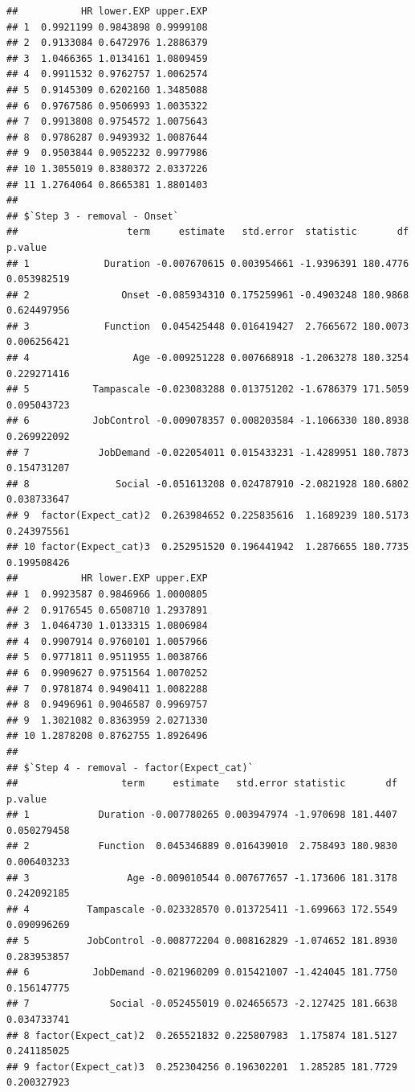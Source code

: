 \documentclass[
]{book}
\begin{document}
\begin{verbatim}
##           HR lower.EXP upper.EXP
## 1  0.9921199 0.9843898 0.9999108
## 2  0.9133084 0.6472976 1.2886379
## 3  1.0466365 1.0134161 1.0809459
## 4  0.9911532 0.9762757 1.0062574
## 5  0.9145309 0.6202160 1.3485088
## 6  0.9767586 0.9506993 1.0035322
## 7  0.9913808 0.9754572 1.0075643
## 8  0.9786287 0.9493932 1.0087644
## 9  0.9503844 0.9052232 0.9977986
## 10 1.3055019 0.8380372 2.0337226
## 11 1.2764064 0.8665381 1.8801403
## 
## $`Step 3 - removal - Onset`
##                   term     estimate   std.error  statistic       df     p.value
## 1             Duration -0.007670615 0.003954661 -1.9396391 180.4776 0.053982519
## 2                Onset -0.085934310 0.175259961 -0.4903248 180.9868 0.624497956
## 3             Function  0.045425448 0.016419427  2.7665672 180.0073 0.006256421
## 4                  Age -0.009251228 0.007668918 -1.2063278 180.3254 0.229271416
## 5           Tampascale -0.023083288 0.013751202 -1.6786379 171.5059 0.095043723
## 6           JobControl -0.009078357 0.008203584 -1.1066330 180.8938 0.269922092
## 7            JobDemand -0.022054011 0.015433231 -1.4289951 180.7873 0.154731207
## 8               Social -0.051613208 0.024787910 -2.0821928 180.6802 0.038733647
## 9  factor(Expect_cat)2  0.263984652 0.225835616  1.1689239 180.5173 0.243975561
## 10 factor(Expect_cat)3  0.252951520 0.196441942  1.2876655 180.7735 0.199508426
##           HR lower.EXP upper.EXP
## 1  0.9923587 0.9846966 1.0000805
## 2  0.9176545 0.6508710 1.2937891
## 3  1.0464730 1.0133315 1.0806984
## 4  0.9907914 0.9760101 1.0057966
## 5  0.9771811 0.9511955 1.0038766
## 6  0.9909627 0.9751564 1.0070252
## 7  0.9781874 0.9490411 1.0082288
## 8  0.9496961 0.9046587 0.9969757
## 9  1.3021082 0.8363959 2.0271330
## 10 1.2878208 0.8762755 1.8926496
## 
## $`Step 4 - removal - factor(Expect_cat)`
##                  term     estimate   std.error statistic       df     p.value
## 1            Duration -0.007780265 0.003947974 -1.970698 181.4407 0.050279458
## 2            Function  0.045346889 0.016439010  2.758493 180.9830 0.006403233
## 3                 Age -0.009010544 0.007677657 -1.173606 181.3178 0.242092185
## 4          Tampascale -0.023328570 0.013725411 -1.699663 172.5549 0.090996269
## 5          JobControl -0.008772204 0.008162829 -1.074652 181.8930 0.283953857
## 6           JobDemand -0.021960209 0.015421007 -1.424045 181.7750 0.156147775
## 7              Social -0.052455019 0.024656573 -2.127425 181.6638 0.034733741
## 8 factor(Expect_cat)2  0.265521832 0.225807983  1.175874 181.5127 0.241185025
## 9 factor(Expect_cat)3  0.252304256 0.196302201  1.285285 181.7729 0.200327923

\end{verbatim}
\end{document}
